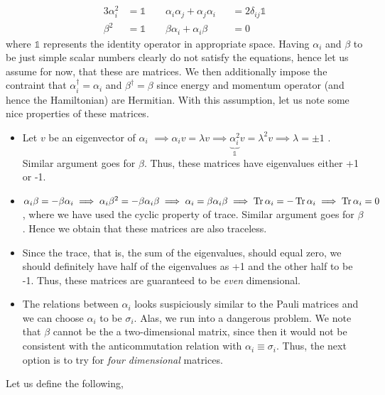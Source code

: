 \begin{alignat*}{3}
\alpha_i^2 &= \mathds{1}\qquad  \alpha_i \alpha_j + \alpha_j \alpha_i &&= 2\delta_{ij}\mathds{1}\\
\beta^2 &=\mathds{1} \qquad \beta \alpha_i + \alpha_i \beta &&= 0
\end{alignat*}
where $\mathds{1}$ represents the identity operator in appropriate space. Having $\alpha_i$ and $\beta$ to be just simple scalar numbers clearly do not satisfy the equations, hence let us assume for now, that these are matrices. We then additionally impose the contraint that $\alpha_i^\dagger = \alpha_i$ and $\beta^\dagger = \beta$ since energy and momentum operator (and hence the Hamiltonian) are Hermitian. With this assumption, let us note some nice properties of these matrices. 
\begin{itemize}
    \item Let $v$ be an eigenvector of $\alpha_i$ $\implies \alpha_i v = \lambda v\implies \underbrace{\alpha_i^2}_{\mathds{1}} v = \lambda^2 v \implies \lambda = \pm 1$ . Similar argument goes for $\beta$. Thus, these matrices have eigenvalues either +1 or -1. 
    \item $\alpha_i\beta = -\beta \alpha_i \implies \alpha_i\beta^2 = -\beta\alpha_i\beta \implies \alpha_i = \beta\alpha_i\beta\implies \Tr \alpha_i = -\Tr \alpha_i \implies \Tr \alpha_i=0 $,
    where we have used the cyclic property of trace. Similar argument goes for $\beta$. Hence we obtain that these matrices are also traceless.
    \item Since the trace, that is, the sum of the eigenvalues, should equal zero, we should definitely have half of the eigenvalues as +1 and the other half to be -1. Thus, these matrices are guaranteed to be \textit{even} dimensional. 
    \item The relations between $\alpha_i$  looks suspiciously similar to the Pauli matrices and we can choose $\alpha_i$ to be $\sigma_i$. Alas, we run into a dangerous problem. We note that $\beta$ cannot be the a two-dimensional matrix, since then it would not be consistent with the anticommutation relation with $\alpha_i\equiv \sigma_i$. Thus, the next option is to try for \textit{four dimensional} matrices.
\end{itemize}
\pagebreak
Let us define the following, 

